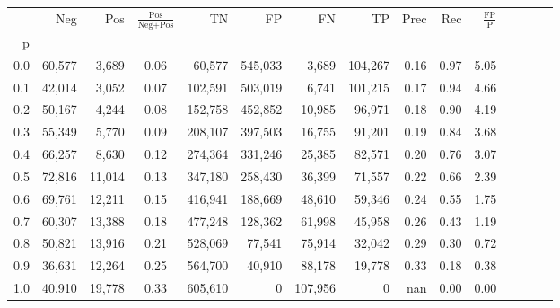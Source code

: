 \begin{tabular}{rrrcrrrrrrrrrrr}
\toprule
{} &     Neg &     Pos & $\frac{\text{Pos}}{\text{Neg}+\text{Pos}}$ &       TN &       FP &       FN &       TP &  Prec &   Rec & $\frac{\text{FP}}{\text{P}}$ \\
p   &         &         &                                            &          &          &          &          &       &       &                              \\
\midrule
0.0 &  60,577 &   3,689 &                                       0.06 &   60,577 &  545,033 &    3,689 &  104,267 &  0.16 &  0.97 &                         5.05 \\
0.1 &  42,014 &   3,052 &                                       0.07 &  102,591 &  503,019 &    6,741 &  101,215 &  0.17 &  0.94 &                         4.66 \\
0.2 &  50,167 &   4,244 &                                       0.08 &  152,758 &  452,852 &   10,985 &   96,971 &  0.18 &  0.90 &                         4.19 \\
0.3 &  55,349 &   5,770 &                                       0.09 &  208,107 &  397,503 &   16,755 &   91,201 &  0.19 &  0.84 &                         3.68 \\
0.4 &  66,257 &   8,630 &                                       0.12 &  274,364 &  331,246 &   25,385 &   82,571 &  0.20 &  0.76 &                         3.07 \\
0.5 &  72,816 &  11,014 &                                       0.13 &  347,180 &  258,430 &   36,399 &   71,557 &  0.22 &  0.66 &                         2.39 \\
0.6 &  69,761 &  12,211 &                                       0.15 &  416,941 &  188,669 &   48,610 &   59,346 &  0.24 &  0.55 &                         1.75 \\
0.7 &  60,307 &  13,388 &                                       0.18 &  477,248 &  128,362 &   61,998 &   45,958 &  0.26 &  0.43 &                         1.19 \\
0.8 &  50,821 &  13,916 &                                       0.21 &  528,069 &   77,541 &   75,914 &   32,042 &  0.29 &  0.30 &                         0.72 \\
0.9 &  36,631 &  12,264 &                                       0.25 &  564,700 &   40,910 &   88,178 &   19,778 &  0.33 &  0.18 &                         0.38 \\
1.0 &  40,910 &  19,778 &                                       0.33 &  605,610 &        0 &  107,956 &        0 &   nan &  0.00 &                         0.00 \\
\bottomrule
\end{tabular}
